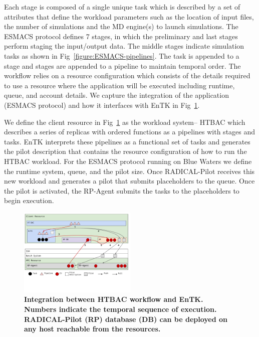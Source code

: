 
Each stage is composed of a single unique task which is described by a set of attributes that define the workload parameters such as the location of input files, the number of simulations and the MD engine(s) to launch simulations. The ESMACS protocol defines 7 stages, in which the preliminary and last stages perform staging the input/output data. The middle stages indicate simulation tasks as shown in Fig~\ref{figure:ESMACS-pipelines}. The task is appended to a stage and stages are appended to a pipeline to maintain temporal order. The workflow relies on a resource configuration which consists of the details required to use a resource where the application will be executed including runtime, queue, and account details. We capture the integration of the application (ESMACS protocol) and how it interfaces with EnTK in Fig~\ref{figure:ht-bac_rp}. 

We define the client resource in Fig~\ref{figure:ht-bac_rp} as the workload system-- HTBAC which describes a series of replicas with ordered functions as a pipelines with stages and tasks. EnTK interprets these pipelines as a functional set of tasks and generates the pilot description that contains the resource configuration of how to run the HTBAC workload. For the ESMACS protocol running on Blue Waters we define the runtime system, queue, and the pilot size. Once RADICAL-Pilot receives this new workload and generates a pilot that submits placeholders to the queue. Once the pilot is activated, the RP-Agent submits the tasks to the placeholders to begin execution.  


\begin{figure}[ht]
\centering
  \includegraphics[width=0.5\textwidth]{FIGURES/ht-bac-rp_integration.pdf}
  \caption{\bf Integration between HTBAC workflow and EnTK. Numbers indicate the temporal sequence of execution. RADICAL-Pilot (RP) database (DB) can be deployed on any host reachable from the resources.}
   \label{figure:ht-bac_rp}
\end{figure}

